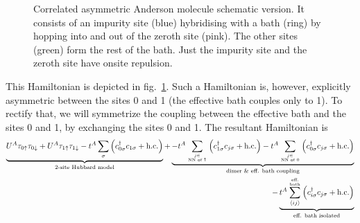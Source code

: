 \documentclass{report}
\numberwithin{equation}{section}
\begin{document}
{\begin{figure}[!htb]
 	\caption{Correlated asymmetric Anderson molecule schematic version. It consists of an impurity site (blue) hybridising with a bath (ring) by hopping into and out of the zeroth site (pink). The other sites (green) form the rest of the bath. Just the impurity site and the zeroth site have onsite repulsion.}
 	\label{and_mol}
 \end{figure}
 This Hamiltonian is depicted in fig.~\ref{and_mol}. Such a Hamiltonian is, however, explicitly asymmetric between the sites 0 and 1 (the effective bath couples only to 1). To rectify that, we will symmetrize the coupling between the effective bath and the sites 0 and 1, by exchanging the sites 0 and 1. The resultant Hamiltonian is
 \begin{equation}\begin{aligned}
 	\underbrace{U^A\tau_{0 \uparrow}\tau_{0 \downarrow} + U^A\tau_{1 \uparrow}\tau_{1 \downarrow} - t^A\sum_{\sigma}\left(c^\dagger_{0\sigma}c_{1\sigma} + \text{h.c.}\right)}_\text{2-site Hubbard model} +\underbrace{- t^A\sum_{j \in \atop{\text{NN of 1}}}\left(c^\dagger_{1\sigma}c_{j\sigma} + \text{h.c.}\right)- t^A\sum_{j \in \atop{\text{NN of 0}}}\left(c^\dagger_{0\sigma}c_{j\sigma} + \text{h.c.}\right)}_\text{dimer \& eff. bath coupling} \\
 	- \underbrace{t^A \sum_{\left<ij \right>}^{\text{eff.} \atop{\text{bath}}}\left(c^\dagger_{i\sigma}c_{j\sigma} + \text{h.c.}\right)}_\text{eff. bath isolated}
 \end{aligned}\end{equation}

}
\end{document}
